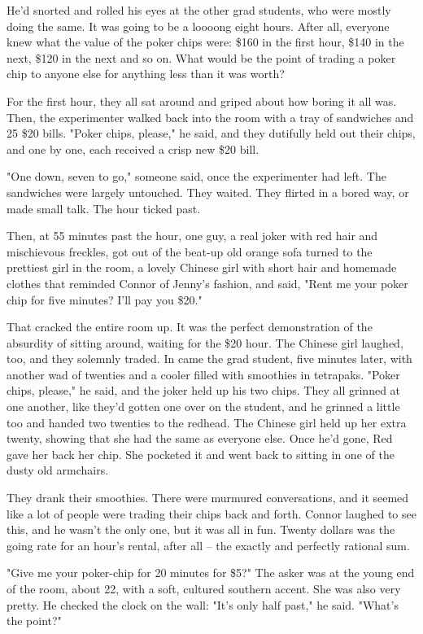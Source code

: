 He'd snorted and rolled his eyes at the other grad students, who
were mostly doing the same. It was going to be a loooong eight
hours. After all, everyone knew what the value of the poker chips
were: \$160 in the first hour, \$140 in the next, \$120 in the next
and so on. What would be the point of trading a poker chip to
anyone else for anything less than it was worth?

For the first hour, they all sat around and griped about how boring
it all was. Then, the experimenter walked back into the room with a
tray of sandwiches and 25 \$20 bills. "Poker chips, please," he
said, and they dutifully held out their chips, and one by one, each
received a crisp new \$20 bill.

"One down, seven to go," someone said, once the experimenter had
left. The sandwiches were largely untouched. They waited. They
flirted in a bored way, or made small talk. The hour ticked past.

Then, at 55 minutes past the hour, one guy, a real joker with red
hair and mischievous freckles, got out of the beat-up old orange
sofa turned to the prettiest girl in the room, a lovely Chinese
girl with short hair and homemade clothes that reminded Connor of
Jenny's fashion, and said, "Rent me your poker chip for five
minutes? I'll pay you \$20."

That cracked the entire room up. It was the perfect demonstration
of the absurdity of sitting around, waiting for the \$20 hour. The
Chinese girl laughed, too, and they solemnly traded. In came the
grad student, five minutes later, with another wad of twenties and
a cooler filled with smoothies in tetrapaks. "Poker chips, please,"
he said, and the joker held up his two chips. They all grinned at
one another, like they'd gotten one over on the student, and he
grinned a little too and handed two twenties to the redhead. The
Chinese girl held up her extra twenty, showing that she had the
same as everyone else. Once he'd gone, Red gave her back her chip.
She pocketed it and went back to sitting in one of the dusty old
armchairs.

They drank their smoothies. There were murmured conversations, and
it seemed like a lot of people were trading their chips back and
forth. Connor laughed to see this, and he wasn't the only one, but
it was all in fun. Twenty dollars was the going rate for an hour's
rental, after all -- the exactly and perfectly rational sum.

"Give me your poker-chip for 20 minutes for \$5?" The asker was at
the young end of the room, about 22, with a soft, cultured southern
accent. She was also very pretty. He checked the clock on the wall:
"It's only half past," he said. "What's the point?"

